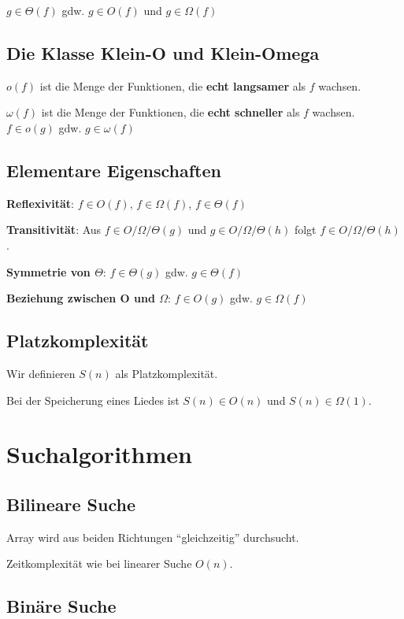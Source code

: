 \documentclass[12pt]{article}
\begin{document}
$g \in \Theta(f)$ gdw. $g \in O(f)$ und $g \in \Omega(f)$

\subsection{Die Klasse Klein-O und Klein-Omega}

$o(f)$ ist die Menge der Funktionen, die \textbf{echt langsamer} als $f$ wachsen.

$\omega(f)$ ist die Menge der Funktionen, die \textbf{echt schneller} als $f$ wachsen.\\

$f \in o(g)$ gdw. $g \in \omega(f)$

\subsection{Elementare Eigenschaften}

\textbf{Reflexivität}: $f \in O(f)$, $f \in \Omega(f)$, $f \in \Theta(f)$

\textbf{Transitivität}: Aus $f \in O/\Omega/\Theta(g)$ und $g \in O/\Omega/\Theta(h)$ folgt $f \in O/\Omega/\Theta(h)$.

\textbf{Symmetrie von $\Theta$}: $f \in \Theta(g)$ gdw. $g \in \Theta(f)$

\textbf{Beziehung zwischen O und $\Omega$}: $f \in O(g)$ gdw. $g \in \Omega(f)$

\subsection{Platzkomplexität}

Wir definieren $S(n)$ als Platzkomplexität.

Bei der Speicherung eines Liedes ist $S(n) \in O(n)$ und $S(n) \in \Omega(1)$.

\section{Suchalgorithmen}

\subsection{Bilineare Suche}

Array wird aus beiden Richtungen \enquote{gleichzeitig} durchsucht.

Zeitkomplexität wie bei linearer Suche $O(n)$.

\subsection{Binäre Suche}
\end{document}
